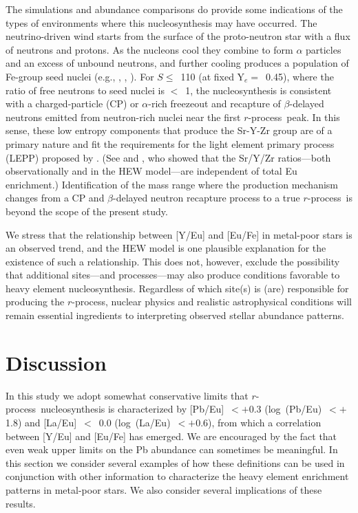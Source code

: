 \documentclass{emulateapj}
\def\rpro{\mbox{$r$-process}}
\begin{document}
The simulations and abundance comparisons 
do provide some indications of the types of environments 
where this nucleosynthesis may have occurred.
The neutrino-driven wind starts from the surface of the 
proto-neutron star with a flux of neutrons and protons.
As the nucleons cool they combine to form $\alpha$ particles and
an excess of unbound neutrons, and further cooling produces
a population of Fe-group seed nuclei
(e.g., \citealt{woosley94}, \citealt{woosley05}, \citealt{farouqi10}).
For $S \leq$~110 (at fixed Y$_e =$~0.45), 
where the ratio of free neutrons to seed nuclei is $<$~1,
the nucleosynthesis is consistent with a charged-particle (CP)
or $\alpha$-rich freezeout and recapture of $\beta$-delayed neutrons
emitted from neutron-rich nuclei near the first \rpro\ peak.
In this sense, these low entropy components that produce
the Sr-Y-Zr group are of a primary 
nature and fit the requirements for the light element primary
process (LEPP) proposed by \citet{travaglio04}.
(See \citealt{kratz08b} and \citealt{farouqi09}, 
who showed that the Sr/Y/Zr ratios---both
observationally and in the HEW model---are 
independent of total Eu enrichment.)
Identification of the mass range where the production mechanism
changes from a CP and $\beta$-delayed neutron recapture process
to a true \rpro\ is beyond the scope of the present study.

We stress that the relationship between [Y/Eu] and [Eu/Fe]
in metal-poor stars is an observed trend, and the HEW model is 
one plausible explanation for the existence of such a relationship.
This does not, however, exclude the possibility that additional sites---and 
processes---may also produce conditions favorable to heavy element 
nucleosynthesis.
Regardless of which site(s) is (are) responsible for producing the \rpro, 
nuclear physics and realistic astrophysical conditions will remain
essential ingredients to interpreting observed stellar abundance patterns.


\section{Discussion}
\label{discussion}


In this study we adopt somewhat conservative limits
that \rpro\ nucleosynthesis is characterized by 
[Pb/Eu]~$< +$0.3 (log~(Pb/Eu)~$< +$1.8) and
[La/Eu]~$<$~0.0  (log~(La/Eu)~$< +$0.6), from which a correlation
between [Y/Eu] and [Eu/Fe] has emerged.
We are encouraged by the fact that even weak upper limits
on the Pb abundance can sometimes be meaningful.
In this section we consider several examples of how these definitions can 
be used in conjunction with other information to characterize
the heavy element enrichment patterns in metal-poor stars.
We also consider several implications of these results.
\end{document}

